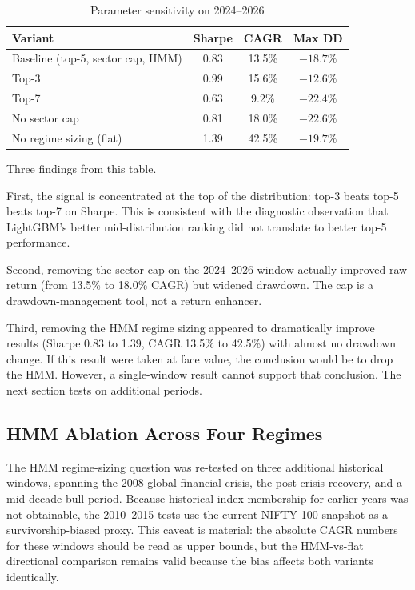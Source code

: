 \documentclass[conference]{IEEEtran}
\begin{document}
\begin{table}[htbp]
\caption{Parameter sensitivity on 2024--2026}
\label{tab:sensitivity}
\centering
\begin{tabular}{lccc}
\toprule
\textbf{Variant} & \textbf{Sharpe} & \textbf{CAGR} & \textbf{Max DD} \\
\midrule
Baseline (top-5, sector cap, HMM) & 0.83 & 13.5\% & $-18.7\%$ \\
Top-3 & 0.99 & 15.6\% & $-12.6\%$ \\
Top-7 & 0.63 & 9.2\% & $-22.4\%$ \\
No sector cap & 0.81 & 18.0\% & $-22.6\%$ \\
No regime sizing (flat) & 1.39 & 42.5\% & $-19.7\%$ \\
\bottomrule
\end{tabular}
\end{table}

Three findings from this table.

First, the signal is concentrated at the top of the distribution: top-3 beats top-5 beats top-7 on Sharpe. This is consistent with the diagnostic observation that LightGBM's better mid-distribution ranking did not translate to better top-5 performance.

Second, removing the sector cap on the 2024--2026 window actually improved raw return (from 13.5\% to 18.0\% CAGR) but widened drawdown. The cap is a drawdown-management tool, not a return enhancer.

Third, removing the HMM regime sizing appeared to dramatically improve results (Sharpe 0.83 to 1.39, CAGR 13.5\% to 42.5\%) with almost no drawdown change. If this result were taken at face value, the conclusion would be to drop the HMM. However, a single-window result cannot support that conclusion. The next section tests on additional periods.

\subsection{HMM Ablation Across Four Regimes}

The HMM regime-sizing question was re-tested on three additional historical windows, spanning the 2008 global financial crisis, the post-crisis recovery, and a mid-decade bull period. Because historical index membership for earlier years was not obtainable, the 2010--2015 tests use the current NIFTY 100 snapshot as a survivorship-biased proxy. This caveat is material: the absolute CAGR numbers for these windows should be read as upper bounds, but the HMM-vs-flat directional comparison remains valid because the bias affects both variants identically.
\end{document}
